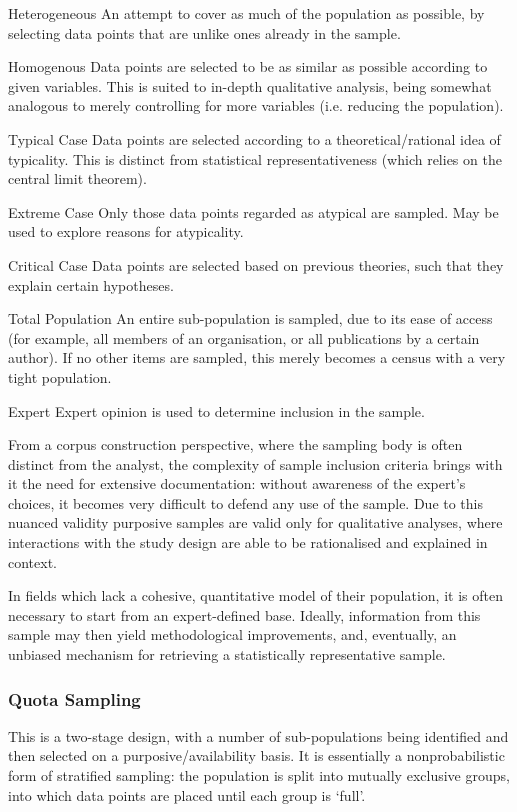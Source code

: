 \begin{itemizeTitle}
    \item[Heterogeneous] An attempt to cover as much of the population as possible, by selecting data points that are unlike ones already in the sample.
    \item[Homogenous] Data points are selected to be as similar as possible according to given variables.  This is suited to in-depth qualitative analysis, being somewhat analogous to merely controlling for more variables (i.e. reducing the population).
    \item[Typical Case] Data points are selected according to a theoretical/rational idea of typicality.  This is distinct from statistical representativeness (which relies on the central limit theorem).
    \item[Extreme Case] Only those data points regarded as atypical are sampled.  May be used to explore reasons for atypicality.
    \item[Critical Case] Data points are selected based on previous theories, such that they explain certain hypotheses.
    \item[Total Population] An entire sub-population is sampled, due to its ease of access (for example, all members of an organisation, or all publications by a certain author).  If no other items are sampled, this merely becomes a census with a very tight population.
    \item[Expert] Expert opinion is used to determine inclusion in the sample.
\end{itemizeTitle}

From a corpus construction perspective, where the sampling body is often distinct from the analyst, the complexity of sample inclusion criteria brings with it the need for extensive documentation: without awareness of the expert's choices, it becomes very difficult to defend any use of the sample.  Due to this nuanced validity purposive samples are valid only for qualitative analyses, where interactions with the study design are able to be rationalised and explained in context.

In fields which lack a cohesive, quantitative model of their population, it is often necessary to start from an expert-defined base.  Ideally, information from this sample may then yield methodological improvements, and, eventually, an unbiased mechanism for retrieving a statistically representative sample.


\subsubsection{Quota Sampling}
This is a two-stage design, with a number of sub-populations being identified and then selected on a purposive/availability basis.  It is essentially a nonprobabilistic form of stratified sampling: the population is split into mutually exclusive groups, into which data points are placed until each group is `full'.

